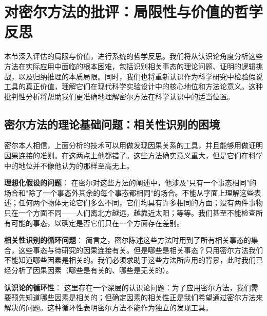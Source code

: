 \section{对密尔方法的批评：局限性与价值的哲学反思}

\begin{logicbox}[title=引言]
本节深入评估的局限与价值，进行系统的哲学反思。我们将从认识论角度分析这些方法在实际应用中面临的根本困难，包括识别相关事态的理论问题、证明的逻辑挑战，以及归纳推理的本质局限。同时，我们也将重新认识作为科学研究中检验假说工具的真正价值，理解它们在现代科学实验设计中的核心地位和方法论意义。这种批判性分析将帮助我们更准确地理解密尔方法在科学认识中的适当位置。
\end{logicbox}

\subsection{密尔方法的理论基础问题：相关性识别的困境}

\begin{theorembox}[title=密尔方法的根本局限性]
密尔本人相信，上面分析的技术可以用做发现因果关系的工具，并且能够用做证明因果连接的准则。在这两点上他都错了。这些方法确实意义重大，但是它们在科学中的地位并不像他认为的那样至高无上。

\textbf{理想化假设的问题}：
在密尔对这些方法的阐述中，他涉及"只有一个事态相同"的场合和"除了一个事态外其余的每个事态都相同"的场合。不能从字面上理解这些表述；任何两个物体无论它们多么不同，它们均具有许多相同的方面；没有两件事物只在一个方面不同——人们离北方越远，越靠近太阳；等等。我们甚至不能检查所有可能的事态，以确定是否它们只在一个方面存在差别。

\textbf{相关性识别的循环问题}：
简言之，密尔陈述这些方法时用到了所有相关事态的集合，这些事态与待研究的因果连接有关。但是哪些是相关事态？只用密尔方法我们不能知道哪些因素是相关的。我们必须求助于这些方法所应用的背景，此时我们已经分析了因果因素（哪些是有关的、哪些是无关的）。

\textbf{认识论的循环性}：
这里存在一个深层的认识论问题：为了应用密尔方法，我们需要预先知道哪些因素是相关的；但确定因素的相关性正是我们希望通过密尔方法来解决的问题。这种循环性表明密尔方法不能作为独立的发现工具。
\end{theorembox}

